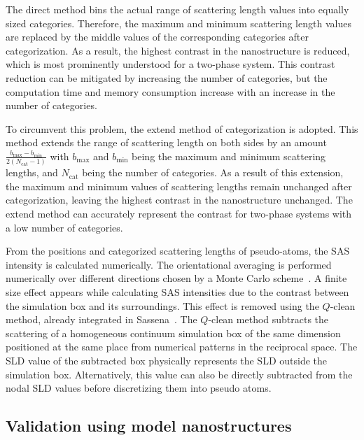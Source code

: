 \documentclass[preprint, 5p, times, twocolumn]{elsarticle}
\begin{document}
The direct method bins the actual range of scattering length values into equally sized categories. Therefore, the maximum and minimum scattering length values are replaced by the middle values of the corresponding categories after categorization. As a result, the highest contrast in the nanostructure is reduced, which is most prominently understood for a two-phase system. This contrast reduction can be mitigated by increasing the number of categories, but the computation time and memory consumption increase with an increase in the number of categories.

To circumvent this problem, the extend method of categorization is adopted. This method extends the range of scattering length on both sides by an amount $\frac{b_{\text{max}} - b_{\text{min}}}{2(N_{\text{cat}}-1)}$ with $b_{\text{max}}$ and $b_{\text{min}}$ being the maximum and minimum scattering lengths, and $N_{\text{cat}}$ being the number of categories. As a result of this extension, the maximum and minimum values of scattering lengths remain unchanged after categorization, leaving the highest contrast in the nanostructure unchanged. The extend method can accurately represent the contrast for two-phase systems with a low number of categories.

From the positions and categorized scattering lengths of pseudo-atoms, the SAS intensity is calculated numerically. The orientational averaging is performed numerically over different directions chosen by a Monte Carlo scheme~\cite{majumdar2024computation}. A finite size effect appears while calculating SAS intensities due to the contrast between the simulation box and its surroundings. This effect is removed using the $Q$-clean method, already integrated in Sassena~\cite{majumdar2024computation}. The $Q$-clean method subtracts the scattering of a homogeneous continuum simulation box of the same dimension positioned at the same place from numerical patterns in the reciprocal space. The SLD value of the subtracted box physically represents the SLD outside the simulation box. Alternatively, this value can also be directly subtracted from the nodal SLD values before discretizing them into pseudo atoms.

\subsection{Validation using model nanostructures}
\label{subsec:res_val}
\end{document}
